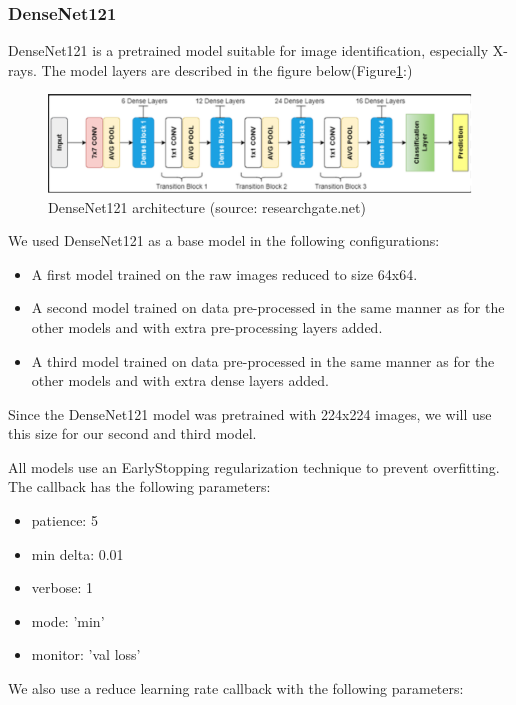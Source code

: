 \documentclass{article}
\begin{document}
\newpage
\subsubsection{DenseNet121}
DenseNet121 is a pretrained model suitable for image identification, especially X-rays. The model layers are described in the figure below(Figure\ref{fig:DN121architecture}:)\\

\begin{figure}[H]
    \centering
    \includegraphics[width=0.8\linewidth]{DN121architecture.png}
    \caption{DenseNet121 architecture (source: researchgate.net)}
    \label{fig:DN121architecture}
\end{figure}

We used DenseNet121 as a base model in the following configurations:
\begin{itemize}
    \item A first model trained on the raw images reduced to size 64x64.
    \item A second model trained on data pre-processed in the same manner as for the other models and with extra pre-processing layers added.
    \item A third model trained on data pre-processed in the same manner as for the other models and with extra dense layers added.
\end{itemize}
 Since the DenseNet121 model was pretrained with 224x224 images, we will use this size for our second and third model.

All models use an EarlyStopping regularization technique to prevent overfitting. The callback has the following parameters:

\begin{itemize}
    \item patience: 5
    \item min delta: 0.01
    \item verbose: 1
    \item mode: 'min'
    \item  monitor: 'val loss'
\end{itemize} 

We also use a reduce learning rate callback with the following parameters:
\end{document}
